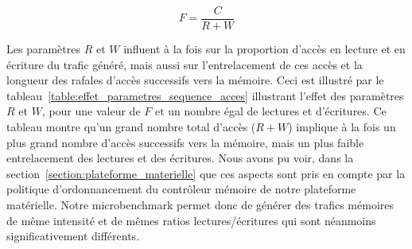 \begin{equation}
	F = \frac{C}{R+W}
	\label{eq:throttle_rate}
\end{equation}

Les paramètres $R$ et $W$ influent à la fois sur la proportion d'accès en lecture et en écriture du trafic généré, mais aussi sur l'entrelacement de ces accès et la longueur des rafales d'accès successifs vers la mémoire.
Ceci est illustré par le tableau~\ref{table:effet_parametres_sequence_acces} illustrant l'effet des paramètres $R$ et $W$, pour une valeur de $F$ et un nombre égal de lectures et d'écritures.
Ce tableau montre qu'un grand nombre total d'accès ($R+W$) implique à la fois un plus grand nombre d'accès successifs vers la mémoire, mais un plus faible entrelacement des lectures et des écritures.
Nous avons pu voir, dans la section~\ref{section:plateforme_materielle} que ces aspects sont pris en compte par la politique d'ordonnancement du contrôleur mémoire de notre plateforme matérielle.
Notre microbenchmark permet donc de générer des trafics mémoires de même intensité et de mêmes ratios lectures/écritures qui sont néanmoins significativement différents.

	
	
